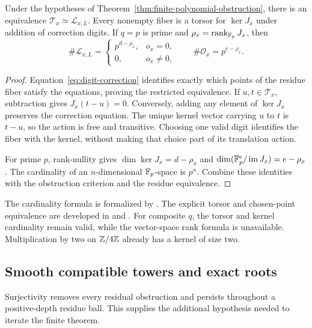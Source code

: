 \begin{theorem}\label{thm:lift-torsor-count}
Under the hypotheses of Theorem~\ref{thm:finite-polynomial-obstruction},
there is an equivalence $\mathcal T_x\simeq\mathcal L_{x,L}$.
Every nonempty fiber is a torsor for $\ker J_x$ under addition of
correction digits. If $q=p$ is prime and
$\rho_x=\operatorname{rank}_{\mathbb F_p}J_x$, then
\begin{equation}\label{eq:lift-count}
 \#\mathcal L_{x,L}=
 \begin{cases}p^{d-\rho_x},&o_x=0,\\0,&o_x\ne0,\end{cases}
 \qquad
 \#\mathcal O_x=p^{e-\rho_x}.
\end{equation}
\end{theorem}

\begin{proof}
Equation~\eqref{eq:digit-correction} identifies exactly which points of the
residue fiber satisfy the equations, proving the restricted equivalence.
If $u,t\in\mathcal T_x$, subtraction gives $J_x(t-u)=0$. Conversely,
adding any element of $\ker J_x$ preserves the correction equation. The
unique kernel vector carrying $u$ to $t$ is $t-u$, so the action is free
and transitive. Choosing one valid digit identifies the fiber with the
kernel, without making that choice part of its translation action.

For prime $p$, rank-nullity gives
$\dim\ker J_x=d-\rho_x$ and
$\dim(\mathbb F_p^e/\operatorname{im} J_x)=e-\rho_x$. The cardinality of an
$n$-dimensional $\mathbb F_p$-space is $p^n$. Combine these identities with the
obstruction criterion and the residue equivalence.
\end{proof}

The cardinality formula is formalized by
.
The explicit torsor and chosen-point equivalence are developed in
 and
.
For composite $q$, the torsor and kernel cardinality remain valid, while the
vector-space rank formula is unavailable. Multiplication by two on
$\mathbb Z/4\mathbb Z$ already has a kernel of size two.

\subsection{Smooth compatible towers and exact roots}

Surjectivity removes every residual obstruction and persists throughout a
positive-depth residue ball. This supplies the additional hypothesis needed
to iterate the finite theorem.

